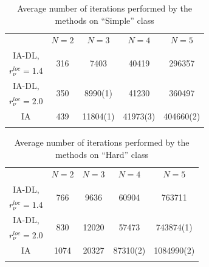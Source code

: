 \documentclass[twocolumn]{svjour3}          %
\begin{document}
\begin{table}[h!]
	\caption{Average number of iterations performed by the methods on “Simple” class}
	\label{tab:average_number_of_iterations_simple}
	\begin{tabular}[]{ccccc}
		\hline\noalign{\smallskip}
		                    & $N=2$                & $N=3$                    & $N=4$                  & $N=5$                   \\
		\noalign{\smallskip}\hline\noalign{\smallskip}
		IA-DL,              & \multirow{2}{*}{316} & \multirow{2}{*}{7403}    & \multirow{2}{*}{40419} & \multirow{2}{*}{296357} \\
		$r_{\nu}^{loc}=1.4$ &                      &                          &                        &                         \\
		IA-DL,              & \multirow{2}{*}{350} & \multirow{2}{*}{8990(1)} & \multirow{2}{*}{41230} & \multirow{2}{*}{360497} \\
		$r_{\nu}^{loc}=2.0$ &                      &                          &                        &                         \\
		IA                  & 439                  & 11804(1)                 & 41973(3)               & 404660(2)               \\
		\hline\noalign{\smallskip}
	\end{tabular}
\end{table}

\begin{table}[h!]
	\caption{Average number of iterations performed by the methods on “Hard” class}
	\label{tab:average_number_of_iterations_hard}
	\begin{tabular}{ccccc}
		\hline\noalign{\smallskip}
		                    & $N=2$                & $N=3$                    & $N=4$                  & $N=5$                      \\
		\noalign{\smallskip}\hline\noalign{\smallskip}
		IA-DL,              & \multirow{2}{*}{766} & \multirow{2}{*}{9636}    & \multirow{2}{*}{60904} & \multirow{2}{*}{763711}    \\
		$r_{\nu}^{loc}=1.4$ &                      &                          &                        &                            \\
		IA-DL,              & \multirow{2}{*}{830} & \multirow{2}{*}{12020}   & \multirow{2}{*}{57473} & \multirow{2}{*}{743874(1)} \\
		$r_{\nu}^{loc}=2.0$ &                      &                          &                        &                            \\
		IA                  & 1074                 & 20327                    & 87310(2)               & 1084990(2)                 \\
		\hline\noalign{\smallskip}
	\end{tabular}
\end{table}
\end{document}
